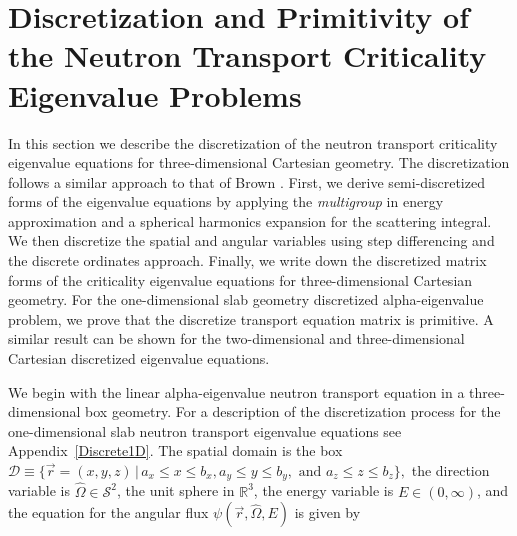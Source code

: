 \chapter[Discretization and Primitivity of the Neutron Transport Criticality \\ Eigenvalue Problems][Discretization and Primitivity]{Discretization and Primitivity of the Neutron Transport Criticality Eigenvalue Problems}
\label{Discrete}

In this section we describe the discretization of the neutron transport criticality eigenvalue equations for three-dimensional Cartesian geometry. The discretization follows a similar approach to that of Brown \cite{brown_linear_1995} \cite{brown_POI_2008} \cite{brown_POI_2012}. First, we derive semi-discretized forms of the eigenvalue equations by applying the \textit{multigroup} in energy approximation and a spherical harmonics expansion for the scattering integral. We then discretize the spatial and angular variables using step differencing and the discrete ordinates approach. Finally, we write down the discretized matrix forms of the criticality eigenvalue equations for three-dimensional Cartesian geometry. For the one-dimensional slab geometry discretized alpha-eigenvalue problem, we prove that the discretize transport equation matrix is primitive. A similar result can be shown for the two-dimensional and three-dimensional Cartesian discretized eigenvalue equations.

We begin with the linear alpha-eigenvalue neutron transport equation in a three-dimen\-sional box geometry. For a description of the discretization process for the one-dimensional slab neutron transport eigenvalue equations see Appendix~\ref{Discrete1D}. The spatial domain is the box $\mathcal{D} \equiv \{\vec{r} = (x, y, z) \, \vert \, a_{x} \leq x \leq b_{x}, a_{y} \leq y \leq b_{y}, \text{ and } a_{z} \leq z \leq b_{z} \},$ the direction variable is $\hat{\Omega} \in \mathcal{S}^{2}$, the unit sphere in $\mathbb{R}^{3}$, the energy variable is $E \in (0, \infty)$, and the equation for the angular flux $\psi(\vec{r}, \hat{\Omega}, E)$ is given by

